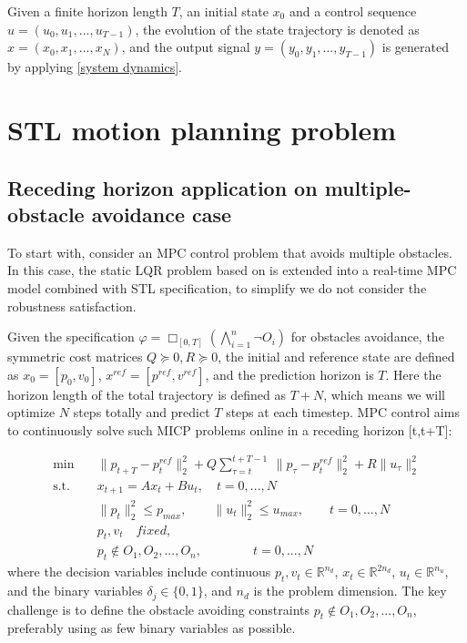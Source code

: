 \documentclass[a4paper]{report}
\begin{document}
Given a finite horizon length $T$, an initial state $x_0$ and a control sequence $u = (u_0, u_1,...,u_{T-1})$, the evolution of the state trajectory is denoted as $x = (x_0,x_1,...,x_N)$, and the output signal $y = (y_0, y_1,...,y_{T-1})$ is generated by applying \ref{system dynamics}. 

\section{STL motion planning problem}
\label{motion_planning_Problem}
\subsection{Receding horizon application on multiple-obstacle avoidance case}

To start with, consider an MPC control problem that avoids multiple obstacles. In this case, the static LQR problem based on \cite{bertsimas2022online} is extended into a real-time MPC model combined with STL specification, to simplify we do not consider the robustness satisfaction. 

Given the specification $\varphi=\Box_{[0,T]}(\bigwedge_{i=1}^n\lnot O_i)$ for obstacles avoidance, the symmetric cost matrices $Q\succeq 0,R\succeq 0 $, the initial and reference state are defined as $x_0 = [p_0,v_0]$, $x^{ref}=[p^{ref},v^{ref}]$, and the prediction horizon is $T$. Here the horizon length of the total trajectory is defined as $T+N$, which means we will optimize $N$ steps totally and predict $T$ steps at each timestep. MPC control aims to continuously solve such MICP problems online in a receding horizon [t,t+T]:

\begin{equation}
    \label{eq3}%
    \begin{aligned}
        \min \quad       &  \| p_{t+T}-p_{t}^{ref} \|_{2}^{2} +  Q\sum_{\tau=t}^{t+T-1}\  \| p_{\tau}-p_{t}^{ref} \|_2^2 + R \|u_{\tau}\|_{2}^2 \\
        \text{s.t.}\quad &
        x_{t+1}=Ax_{t}+Bu_{t},  \quad t=0,...,N                                                                          \\
                         & \|p_t\|_2^{2} \leq p_{max}, \qquad
                         \|u_t\|_2^{2} \leq u_{max}, \qquad  t=0,...,N                                                            \\
                         & p_t, v_t \quad  fixed,                                   \\
                         & p_t \notin O_1,O_2,...,O_n, \qquad\qquad t=0,...,N
    \end{aligned}
\end{equation}
where the decision variables include continuous $p_t, v_t \in \mathbb{R}^{n_d}$, $x_t \in \mathbb{R}^{2n_d}$, $u_t \in \mathbb{R}^{n_u}$, and the binary variables $\delta_j \in \{0,1\}$, and $n_d$ is the problem dimension. The key challenge is to define the obstacle avoiding constraints $p_t \notin O_1,O_2,...,O_n$, preferably using as few binary variables as possible. 
\end{document}

